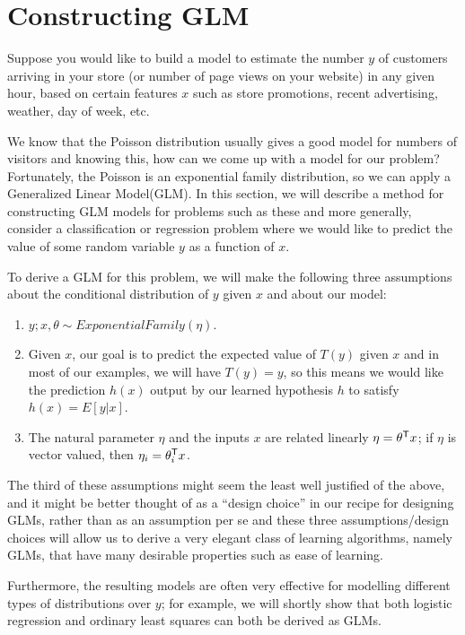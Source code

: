 \section{Constructing GLM}
Suppose you would like to build a model to estimate the number $y$ of customers arriving in your store
(or number of page views on your website) in any given hour, based on certain features $x$ 
such as store promotions, recent advertising, weather, day of week, etc.

We know that the Poisson distribution usually gives a good model for numbers of visitors and knowing this,
how can we come up with a model for our problem? Fortunately, the Poisson is an exponential family distribution,
so we can apply a Generalized Linear Model(GLM).\newline
In this section, we will describe a method for constructing GLM models for problems such as these and 
more generally, consider a classification or regression problem where we would like to predict the value 
of some random variable $y$ as a function of $x$.

To derive a GLM for this problem, we will make the following three assumptions about the conditional distribution
of $y$ given $x$ and about our model:
\begin{enumerate}
    \item $y;x, \theta \sim ExponentialFamily(\eta)$.
    \item Given $x$, our goal is to predict the expected value of $T(y)$ given $x$ and 
          in most of our examples, we will have $T(y) = y$, so this means we would like the prediction $h(x)$
          output by our learned hypothesis $h$ to satisfy $h(x) = E[y | x]$.
    \item The natural parameter $\eta$ and the inputs $x$ are related linearly $\eta = \theta ^ \mathsf{T}x$;
          if $\eta$ is vector valued, then $\eta_i = \theta_i ^ \mathsf{T}x$.
\end{enumerate}
The third of these assumptions might seem the least well justified of the above, and it might be better thought
of as a “design choice” in our recipe for designing GLMs, rather than as an assumption per se and 
these three assumptions/design choices will allow us to derive a very elegant class of learning algorithms,
namely GLMs, that have many desirable properties such as ease of learning.

Furthermore, the resulting models are often very effective for modelling different types of distributions over $y$;
for example, we will shortly show that both logistic regression and ordinary least squares can both be derived as GLMs.

